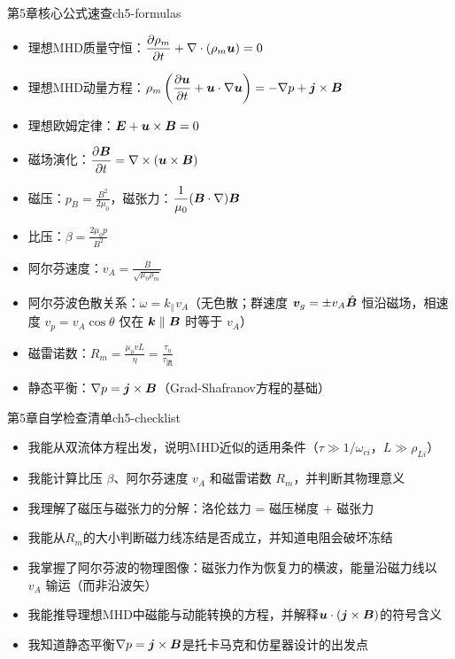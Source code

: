 \begin{formulabox}{第5章核心公式速查}{ch5-formulas}
\begin{itemize}[leftmargin=*,itemsep=0pt]
\item 理想MHD质量守恒：$\displaystyle\frac{\partial\rho_m}{\partial t} + \nabla\cdot(\rho_m\bm{u}) = 0$
\item 理想MHD动量方程：$\displaystyle\rho_m\left(\frac{\partial\bm{u}}{\partial t} + \bm{u}\cdot\nabla\bm{u}\right) = -\nabla p + \bm{j}\times\bm{B}$
\item 理想欧姆定律：$\displaystyle\bm{E} + \bm{u}\times\bm{B} = 0$
\item 磁场演化：$\displaystyle\frac{\partial\bm{B}}{\partial t} = \nabla\times(\bm{u}\times\bm{B})$
\item 磁压：$\displaystyle p_B = \frac{B^2}{2\mu_0}$，磁张力：$\displaystyle\frac{1}{\mu_0}(\bm{B}\cdot\nabla)\bm{B}$
\item 比压：$\displaystyle\beta = \frac{2\mu_0 p}{B^2}$
\item 阿尔芬速度：$\displaystyle v_A = \frac{B}{\sqrt{\mu_0\rho_m}}$
\item 阿尔芬波色散关系：$\displaystyle\omega = k_\parallel v_A$（无色散；群速度 $\bm{v}_g=\pm v_A\hat{\bm{B}}$ 恒沿磁场，相速度 $v_p=v_A\cos\theta$ 仅在 $\bm{k}\parallel\bm{B}$ 时等于 $v_A$）
\item 磁雷诺数：$\displaystyle R_m = \frac{\mu_0 v L}{\eta} = \frac{\tau_\eta}{\tau_{\text{流}}}$
\item 静态平衡：$\displaystyle\nabla p = \bm{j}\times\bm{B}$（Grad-Shafranov方程的基础）
\end{itemize}
\end{formulabox}

\begin{checklistbox}{第5章自学检查清单}{ch5-checklist}
\begin{itemize}[leftmargin=*,label=$\square$]
\item 我能从双流体方程出发，说明MHD近似的适用条件（$\tau\gg 1/\omega_{ci}$，$L\gg\rho_{Li}$）
\item 我能计算比压 $\beta$、阿尔芬速度 $v_A$ 和磁雷诺数 $R_m$，并判断其物理意义
\item 我理解了磁压与磁张力的分解：洛伦兹力 = 磁压梯度 + 磁张力
\item 我能从$R_m$的大小判断磁力线冻结是否成立，并知道电阻会破坏冻结
\item 我掌握了阿尔芬波的物理图像：磁张力作为恢复力的横波，能量沿磁力线以 $v_A$ 输运（而非沿波矢）
\item 我能推导理想MHD中磁能与动能转换的方程，并解释$\bm{u}\cdot(\bm{j}\times\bm{B})$的符号含义
\item 我知道静态平衡$\nabla p = \bm{j}\times\bm{B}$是托卡马克和仿星器设计的出发点
\end{itemize}
\end{checklistbox}

\endinput
